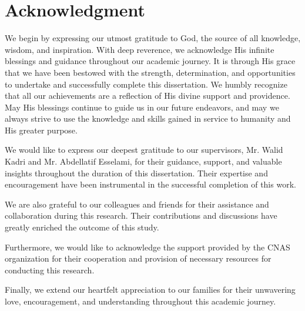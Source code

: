 \documentclass[12pt]{report}
\begin{document}
    
    
    
    


        \vspace*{\fill}
        \section*{\centering Acknowledgment}
        \bigskip
        We begin by expressing our utmost gratitude to God, the source of all knowledge, wisdom, and inspiration. With deep reverence, we acknowledge His infinite blessings and guidance throughout our academic journey. It is through His grace that we have been bestowed with the strength, determination, and opportunities to undertake and successfully complete this dissertation. We humbly recognize that all our achievements are a reflection of His divine support and providence. May His blessings continue to guide us in our future endeavors, and may we always strive to use the knowledge and skills gained in service to humanity and His greater purpose.
        
        \medskip

        We would like to express our deepest gratitude to our supervisors, Mr. Walid Kadri and Mr. Abdellatif Esselami, for their guidance, support, and valuable insights throughout the duration of this dissertation. Their expertise and encouragement have been instrumental in the successful completion of this work.
        
        \medskip
        
        We are also grateful to our colleagues and friends for their assistance and collaboration during this research. Their contributions and discussions have greatly enriched the outcome of this study.
        
        \medskip
        
        Furthermore, we would like to acknowledge the support provided by the CNAS organization for their cooperation and provision of necessary resources for conducting this research.
        
        
       \medskip
        Finally, we extend our heartfelt appreciation to our families for their unwavering love, encouragement, and understanding throughout this academic journey.
        
\end{document}
